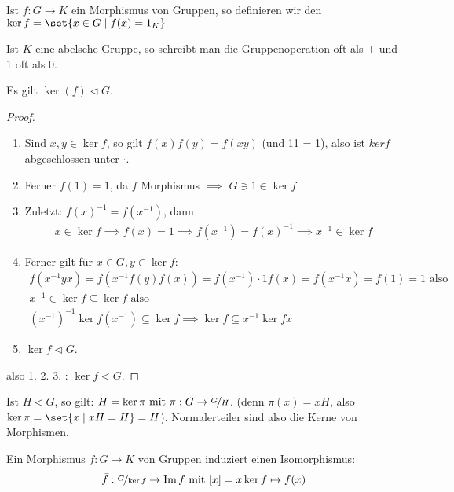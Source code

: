\begin{definition}
	Ist $f: G \to K$ ein Morphismus von Gruppen, so definieren wir den  $\ker f = \set{x \in G \mid f(x) = 1_K}$
\end{definition}
\begin{*remark}
	Ist $K$ eine abelsche Gruppe, so schreibt man die Gruppenoperation oft als $+$ und 1 oft als 0.
\end{*remark}
\begin{proposition}
	Es gilt $\ker(f) \lhd G$.
\end{proposition}
\begin{proof} %
	\begin{enumerate}
		\item Sind $x,y \in \ker f$, so gilt $f(x)f(y) = f(xy)$ (und 11 = 1), also ist $ker f$ abgeschlossen unter $\cdot$.
		\item Ferner $f(1) = 1$, da $f$ Morphismus $\implies$ $G \ni 1 \in \ker f$.
		\item 	Zuletzt: $f(x)^{-1} = f(x^{-1})$, dann
		\begin{align*}
		x \in \ker f \implies f(x) = 1 \implies f(x^{-1}) = f(x)^{-1} \implies x^{-1} \in \ker f
		\end{align*}
		\item Ferner gilt für $x \in G, y \in \ker f$:
		\begin{align*}
		f(x^{-1}yx) = f(x^{-1}f(y)f(x)) = f(x^{-1})\cdot 1 f(x) = f(x^{-1}x) = f(1) = 1 \text{ also}\\
		x^{-1} \in \ker f \subseteq \ker f \text{ also }\\
		(x^{-1})^{-1} \ker f (x^{-1}) \subseteq \ker f \implies \ker f \subseteq x^{-1} \ker f x
		\end{align*}
		\item $\ker f \lhd G$.
	\end{enumerate}
	also 1. 2. 3. : $\ker f < G$. 
\end{proof}
\begin{*remark}
	Ist $H \lhd G$, so gilt: $H = \ker \pi \mit \pi: G \to \lnkset{G}{H}$. (denn $\pi(x) = xH$, also $\ker \pi = \set{x \mid xH = H} = H$). Normalerteiler sind also die Kerne von Morphismen.
\end{*remark}
\begin{proposition}
	Ein Morphismus $f: G \to K$ von Gruppen induziert einen Isomorphismus:
	\begin{align*}
		\bar{f}: \lnkset{G}{\ker f} \to \Image f \mit [x] = x \ker f \mapsto f(x)
	\end{align*}
\end{proposition}
